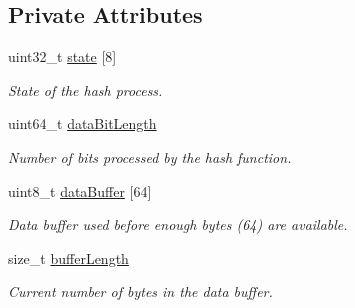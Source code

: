 \subsection*{Private Attributes}
\begin{DoxyCompactItemize}
\item 
\hypertarget{classSHA256_a6fea438dead0fca1139b6a15aa8391f9}{}uint32\+\_\+t \hyperlink{classSHA256_a6fea438dead0fca1139b6a15aa8391f9}{state} \mbox{[}8\mbox{]}\label{classSHA256_a6fea438dead0fca1139b6a15aa8391f9}

\begin{DoxyCompactList}\small\item\em State of the hash process. \end{DoxyCompactList}\item 
\hypertarget{classSHA256_a55dfb8087735d8434927d0112be11cad}{}uint64\+\_\+t \hyperlink{classSHA256_a55dfb8087735d8434927d0112be11cad}{data\+Bit\+Length}\label{classSHA256_a55dfb8087735d8434927d0112be11cad}

\begin{DoxyCompactList}\small\item\em Number of bits processed by the hash function. \end{DoxyCompactList}\item 
\hypertarget{classSHA256_a4c3c09c417432358312a535361723cb2}{}uint8\+\_\+t \hyperlink{classSHA256_a4c3c09c417432358312a535361723cb2}{data\+Buffer} \mbox{[}64\mbox{]}\label{classSHA256_a4c3c09c417432358312a535361723cb2}

\begin{DoxyCompactList}\small\item\em Data buffer used before enough bytes (64) are available. \end{DoxyCompactList}\item 
\hypertarget{classSHA256_ac6a07494572f174c28c3eea4ef8cfd2b}{}size\+\_\+t \hyperlink{classSHA256_ac6a07494572f174c28c3eea4ef8cfd2b}{buffer\+Length}\label{classSHA256_ac6a07494572f174c28c3eea4ef8cfd2b}

\begin{DoxyCompactList}\small\item\em Current number of bytes in the data buffer. \end{DoxyCompactList}\end{DoxyCompactItemize}
